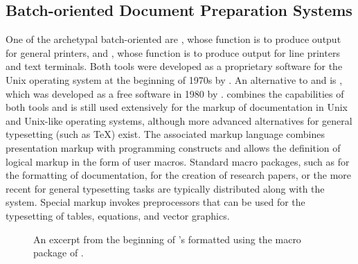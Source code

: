 \documentclass[a5paper,10pt]{book}
\begin{document}
\subsection{Batch-oriented Document Preparation Systems}
One of the archetypal batch-oriented  are %
, whose function is to produce output for general
printers, and %
, whose function is to
produce output for line printers and text terminals. Both tools were developed
as a proprietary software for the Unix operating system at the beginning of
1970s by . An alternative to  and 
is , which
was developed as a free software in 1980 by . 
combines the capabilities of both tools and is still used extensively for the
markup of documentation in Unix and Unix-like operating systems, although more
advanced alternatives for general typesetting (such as \TeX) exist. The
associated markup language combines presentation markup with programming
constructs and allows the definition of logical markup in the form of user
macros. Standard macro packages, such as  for the
 formatting of documentation,
  for the creation
of research papers, or the more recent 
 for general typesetting tasks
are typically distributed along with the system. Special markup invokes
preprocessors that can be used for the typesetting of tables, equations, and
vector graphics.

\begin{figure}
  \caption{An excerpt from the beginning of 's
     formatted using the 
    macro package of .}
  \label{fig:poe}
\end{figure}

\end{document}
